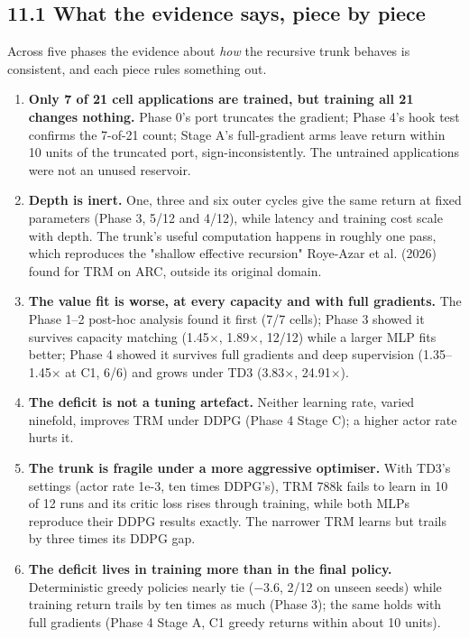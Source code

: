 \documentclass[11pt]{article}
\begin{document}
\subsection*{11.1 What the evidence says, piece by piece}



Across five phases the evidence about \emph{how} the recursive trunk behaves is consistent, and each piece rules something out.



\begin{enumerate}
\item \textbf{Only 7 of 21 cell applications are trained, but training all 21 changes nothing.} Phase 0's port truncates the gradient; Phase 4's hook test confirms the 7-of-21 count; Stage A's full-gradient arms leave return within 10 units of the truncated port, sign-inconsistently. The untrained applications were not an unused reservoir.
\item \textbf{Depth is inert.} One, three and six outer cycles give the same return at fixed parameters (Phase 3, 5/12 and 4/12), while latency and training cost scale with depth. The trunk's useful computation happens in roughly one pass, which reproduces the "shallow effective recursion" Roye-Azar et al. (2026) found for TRM on ARC, outside its original domain.
\item \textbf{The value fit is worse, at every capacity and with full gradients.} The Phase 1--2 post-hoc analysis found it first (7/7 cells); Phase 3 showed it survives capacity matching (1.45$\times$, 1.89$\times$, 12/12) while a larger MLP fits better; Phase 4 showed it survives full gradients and deep supervision (1.35--1.45$\times$ at C1, 6/6) and grows under TD3 (3.83$\times$, 24.91$\times$).
\item \textbf{The deficit is not a tuning artefact.} Neither learning rate, varied ninefold, improves TRM under DDPG (Phase 4 Stage C); a higher actor rate hurts it.
\item \textbf{The trunk is fragile under a more aggressive optimiser.} With TD3's settings (actor rate 1e-3, ten times DDPG's), TRM 788k fails to learn in 10 of 12 runs and its critic loss rises through training, while both MLPs reproduce their DDPG results exactly. The narrower TRM learns but trails by three times its DDPG gap.
\item \textbf{The deficit lives in training more than in the final policy.} Deterministic greedy policies nearly tie ($-$3.6, 2/12 on unseen seeds) while training return trails by ten times as much (Phase 3); the same holds with full gradients (Phase 4 Stage A, C1 greedy returns within about 10 units).

\end{enumerate}
\end{document}
